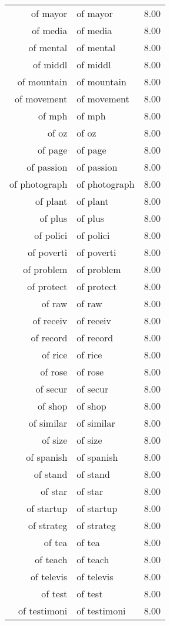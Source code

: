 \begin{table}[ht]
\begin{tabular}{rlr}
  of mayor & of mayor & 8.00 \\ 
  of media & of media & 8.00 \\ 
  of mental & of mental & 8.00 \\ 
  of middl & of middl & 8.00 \\ 
  of mountain & of mountain & 8.00 \\ 
  of movement & of movement & 8.00 \\ 
  of mph & of mph & 8.00 \\ 
  of oz & of oz & 8.00 \\ 
  of page & of page & 8.00 \\ 
  of passion & of passion & 8.00 \\ 
  of photograph & of photograph & 8.00 \\ 
  of plant & of plant & 8.00 \\ 
  of plus & of plus & 8.00 \\ 
  of polici & of polici & 8.00 \\ 
  of poverti & of poverti & 8.00 \\ 
  of problem & of problem & 8.00 \\ 
  of protect & of protect & 8.00 \\ 
  of raw & of raw & 8.00 \\ 
  of receiv & of receiv & 8.00 \\ 
  of record & of record & 8.00 \\ 
  of rice & of rice & 8.00 \\ 
  of rose & of rose & 8.00 \\ 
  of secur & of secur & 8.00 \\ 
  of shop & of shop & 8.00 \\ 
  of similar & of similar & 8.00 \\ 
  of size & of size & 8.00 \\ 
  of spanish & of spanish & 8.00 \\ 
  of stand & of stand & 8.00 \\ 
  of star & of star & 8.00 \\ 
  of startup & of startup & 8.00 \\ 
  of strateg & of strateg & 8.00 \\ 
  of tea & of tea & 8.00 \\ 
  of teach & of teach & 8.00 \\ 
  of televis & of televis & 8.00 \\ 
  of test & of test & 8.00 \\ 
  of testimoni & of testimoni & 8.00 \\ 

\end{tabular}
\end{table}
